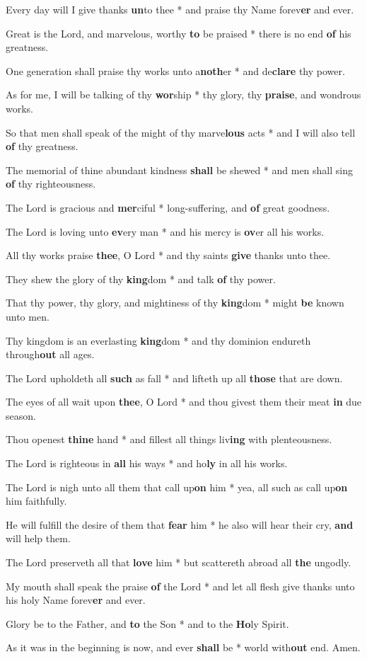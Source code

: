 \begin{multicols}{2}
	Every day will I give thanks \textbf{un}to thee * and praise thy Name forev\textbf{er} and ever.
	
	Great is the Lord, and marvelous, worthy \textbf{to} be praised * there is no end \textbf{of} his greatness.
	
	One generation shall praise thy works unto a\textbf{noth}er * and de\textbf{clare} thy power.
	
	As for me, I will be talking of thy \textbf{wor}ship * thy glory, thy \textbf{praise}, and wondrous works.
	
	So that men shall speak of the might of thy marve\textbf{lous} acts * and I will also tell \textbf{of} thy greatness.
	
	The memorial of thine abundant kindness \textbf{shall} be shewed * and men shall sing \textbf{of} thy righteousness.
	
	The Lord is gracious and \textbf{mer}ciful * long-suffering, and \textbf{of} great goodness.
	
	The Lord is loving unto \textbf{ev}ery man * and his mercy is \textbf{ov}er all his works.
	
	All thy works praise \textbf{thee}, O Lord * and thy saints \textbf{give} thanks unto thee.
	
	They shew the glory of thy \textbf{king}dom * and talk \textbf{of} thy power.
	
	That thy power, thy glory, and mightiness of thy \textbf{king}dom * might \textbf{be} known unto men.
	
	Thy kingdom is an everlasting \textbf{king}dom * and thy dominion endureth through\textbf{out} all ages.
	
	The Lord upholdeth all \textbf{such} as fall * and lifteth up all \textbf{those} that are down.
	
	The eyes of all wait upon \textbf{thee}, O Lord * and thou givest them their meat \textbf{in} due season.
	
	Thou openest \textbf{thine} hand * and fillest all things liv\textbf{ing} with plenteousness.
	
	The Lord is righteous in \textbf{all} his ways * and ho\textbf{ly} in all his works.
	
	The Lord is nigh unto all them that call up\textbf{on} him * yea, all such as call up\textbf{on} him faithfully.
	
	He will fulfill the desire of them that \textbf{fear} him * he also will hear their cry, \textbf{and} will help them.
	
	The Lord preserveth all that \textbf{love} him * but scattereth abroad all \textbf{the} ungodly.
	
	My mouth shall speak the praise \textbf{of} the Lord * and let all flesh give thanks unto his holy Name forev\textbf{er} and ever.
	
	Glory be to the Father, and \textbf{to} the Son * and to the \textbf{Ho}ly Spirit.
	
	As it was in the beginning is now, and ever \textbf{shall} be * world with\textbf{out} end. Amen.
\end{multicols}